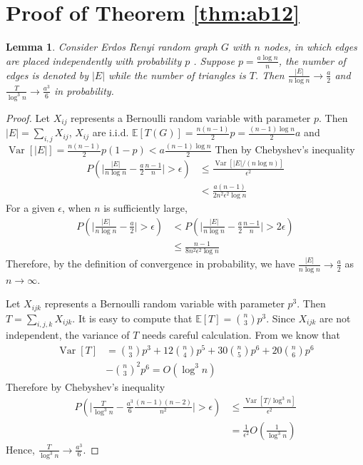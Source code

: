 \documentclass[journal]{IEEEtran}
\newtheorem{lemma}{Lemma}
\newcommand{\A}{\frac{a \log n}{n}}
\newcommand{\1}{\mathbbm{1}}
\DeclareMathOperator{\Var}{Var}
\begin{document}
\section*{Proof of Theorem \ref{thm:ab12}}
\begin{lemma}\label{lem:ER_tr_counting}
	Consider Erdos Renyi random graph $G$ with $n$ nodes, in which edges are placed independently with probability $p$ \cite{erdHos1960evolution}. Suppose
	$p=\A$, the number of edges is denoted by $|E|$ while the number of triangles is $T$. Then
	$\frac{|E|}{n \log n} \to \frac{a}{2}$ and $\frac{T}{\log^3 n} \to \frac{a^3}{6}$ in probability.
\end{lemma}
\begin{proof}
		Let $X_{ij}$ represents a Bernoulli random variable with parameter $p$. Then $|E| = \sum_{i,j} X_{ij}$, $X_{ij}$ are i.i.d.
	$\mathbb{E}[T(G)] = \frac{n(n-1)}{2}p = \frac{(n-1)\log n}{2}a$ and $\Var[|E|] = \frac{n(n-1)}{2} p(1-p) < a\frac{(n-1)\log n}{2}$
	Then by Chebyshev's inequality
	\begin{align*}
	P(\Big|\frac{|E|}{n \log n } - \frac{a}{2} \frac{n-1}{n}\Big| > \epsilon) & \leq
	\frac{\Var[|E| /(n \log n )]}{\epsilon^2} \\
	& < \frac{a(n-1)}{2n^2\epsilon^2\log n}
	\end{align*}
	For a given $\epsilon$, when $n$ is sufficiently large,
	\begin{align*}
	P(\Big|\frac{|E|}{n \log n } - \frac{a}{2} \Big| > \epsilon) & <
	P(\Big|\frac{|E|}{n \log n } - \frac{a}{2} \frac{n-1}{n}\Big| > 2\epsilon) \\
	& \leq \frac{n-1}{8n^2 \epsilon^2 \log n}
	\end{align*}
	Therefore, by the definition of convergence in probability, we have $\frac{|E|}{n \log n} \to \frac{a}{2}$ as $n\to \infty$.
	
	Let $X_{ijk}$ represents a Bernoulli random variable with parameter $p^3$.
	Then $T = \sum_{i,j,k} X_{ijk}$.
	It is easy to compute that $\mathbb{E}[T] = \binom{n}{3}p^3$. Since $X_{ijk}$ are not independent, the variance of $T$ needs careful calculation.
	From \cite{holland1977method} we know that
	\begin{align*}
	\Var[T] & = \binom{n}{3} p^3 + 12 \binom{n}{4} p^5 + 30 \binom{n}{5} p^6 + 20 \binom{n}{6} p^6\\
	 &- \binom{n}{3}^2 p^6   = O(\log^3 n)
	\end{align*}
	Therefore
	by Chebyshev's inequality
	\begin{align*}
	P(\Big|\frac{T}{\log^3 n } - \frac{a^3}{6} \frac{(n-1)(n-2)}{n^2}\Big| > \epsilon) &\leq \frac{\Var[T /\log^3 n ]}{\epsilon^2} \\ 
	& = \frac{1}{\epsilon^2}O(\frac{1}{\log^3 n})
	\end{align*}
	Hence, $\frac{T}{\log^3 n} \to \frac{a^3}{6}$.
\end{proof}
\end{document}
